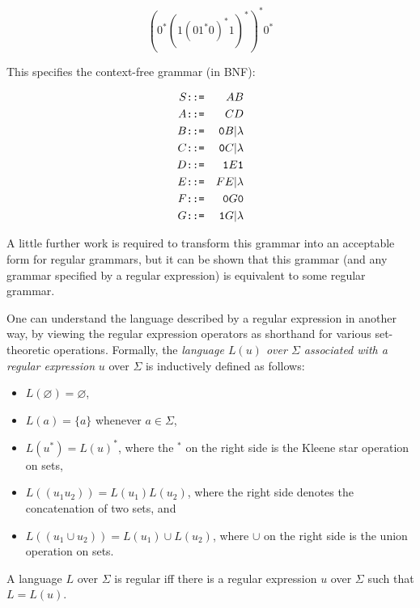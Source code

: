 \documentclass[12pt]{article}
\begin{document}
$$ (0^*(1(01^*0)^*1)^*)^*0^* $$

This specifies the context-free grammar (in BNF):

\begin{center}
\begin{eqnarray*}
S & \verb.::=. & AB \\
A & \verb.::=. & CD \\
B & \verb.::=. & \verb=0=B | \lambda \\
C & \verb.::=. & \verb=0=C | \lambda \\
D & \verb.::=. & \verb=1=E\verb=1= \\
E & \verb.::=. & FE | \lambda \\
F & \verb.::=. & \verb=0=G\verb=0= \\
G & \verb.::=. & \verb=1=G | \lambda 
\end{eqnarray*}
\end{center}

A little further work is required to transform this grammar into an acceptable form for regular grammars, but it can be shown that this grammar (and any grammar specified by a regular expression) is equivalent to some regular grammar.

One can understand the language described by a regular expression in another way, by viewing the regular expression operators as shorthand for various set-theoretic operations.  Formally, the \emph{language $L(u)$ over $\Sigma$ associated with a regular expression} $u$ over $\Sigma$ is inductively defined as follows:
\begin{itemize}
\item $L(\varnothing)=\varnothing$,
\item $L(a)=\lbrace a\rbrace$ whenever $a\in \Sigma$,
\item $L(u^*)=L(u)^*$, where the $^*$ on the right side is the Kleene star operation on sets, 
\item $L((u_1u_2))=L(u_1)L(u_2)$, where the right side denotes the concatenation of two sets, and
\item $L((u_1\cup u_2))=L(u_1)\cup L(u_2)$, where $\cup$ on the right side is the union operation on sets.
\end{itemize}

A language $L$ over $\Sigma$ is regular iff there is a regular expression $u$ over $\Sigma$ such that $L=L(u)$.
\end{document}
